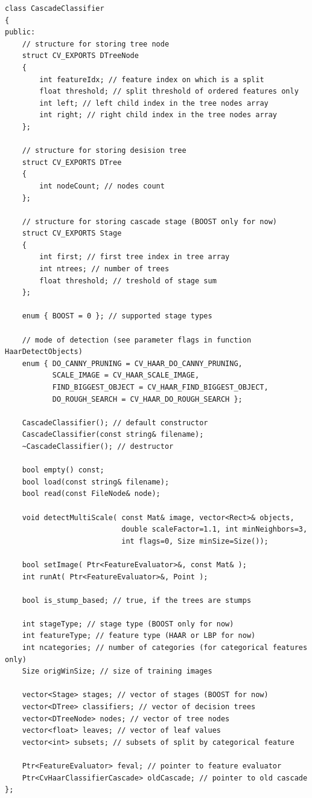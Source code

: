 \begin{lstlisting}
class CascadeClassifier
{
public:
    // structure for storing tree node
    struct CV_EXPORTS DTreeNode
    {
        int featureIdx; // feature index on which is a split
        float threshold; // split threshold of ordered features only
        int left; // left child index in the tree nodes array
        int right; // right child index in the tree nodes array
    };

    // structure for storing desision tree
    struct CV_EXPORTS DTree
    {
        int nodeCount; // nodes count
    };

    // structure for storing cascade stage (BOOST only for now)
    struct CV_EXPORTS Stage
    {
        int first; // first tree index in tree array
        int ntrees; // number of trees
        float threshold; // treshold of stage sum
    };

    enum { BOOST = 0 }; // supported stage types

    // mode of detection (see parameter flags in function HaarDetectObjects)
    enum { DO_CANNY_PRUNING = CV_HAAR_DO_CANNY_PRUNING,
           SCALE_IMAGE = CV_HAAR_SCALE_IMAGE,
           FIND_BIGGEST_OBJECT = CV_HAAR_FIND_BIGGEST_OBJECT,
           DO_ROUGH_SEARCH = CV_HAAR_DO_ROUGH_SEARCH };

    CascadeClassifier(); // default constructor
    CascadeClassifier(const string& filename);
    ~CascadeClassifier(); // destructor

    bool empty() const;
    bool load(const string& filename);
    bool read(const FileNode& node);

    void detectMultiScale( const Mat& image, vector<Rect>& objects,
                           double scaleFactor=1.1, int minNeighbors=3,
                           int flags=0, Size minSize=Size());

    bool setImage( Ptr<FeatureEvaluator>&, const Mat& );
    int runAt( Ptr<FeatureEvaluator>&, Point );

    bool is_stump_based; // true, if the trees are stumps

    int stageType; // stage type (BOOST only for now)
    int featureType; // feature type (HAAR or LBP for now)
    int ncategories; // number of categories (for categorical features only)
    Size origWinSize; // size of training images

    vector<Stage> stages; // vector of stages (BOOST for now)
    vector<DTree> classifiers; // vector of decision trees
    vector<DTreeNode> nodes; // vector of tree nodes
    vector<float> leaves; // vector of leaf values
    vector<int> subsets; // subsets of split by categorical feature

    Ptr<FeatureEvaluator> feval; // pointer to feature evaluator
    Ptr<CvHaarClassifierCascade> oldCascade; // pointer to old cascade
};
\end{lstlisting}

